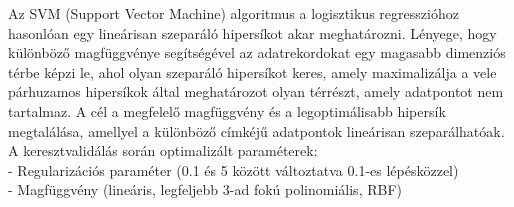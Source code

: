 \documentclass[12pt]{article}
\begin{document}
Az SVM (Support Vector Machine) algoritmus a logisztikus regresszióhoz hasonlóan egy lineárisan szeparáló hipersíkot akar meghatározni. Lényege, hogy különböző magfüggvénye segítségével az adatrekordokat egy magasabb dimenziós térbe képzi le, ahol olyan szeparáló hipersíkot keres, amely maximalizálja a vele párhuzamos hipersíkok által meghatározot olyan térrészt, amely adatpontot nem tartalmaz. A cél a megfelelő magfüggvény és a legoptimálisabb hipersík megtalálása, amellyel a különböző címkéjű adatpontok lineárisan szeparálhatóak. \\

\noindent A keresztvalidálás során optimalizált paraméterek: \\
- Regularizációs paraméter (0.1 és 5 között változtatva 0.1-es lépésközzel)\\
- Magfüggvény (lineáris, legfeljebb 3-ad fokú polinomiális, RBF)



%
%
%
\end{document}
